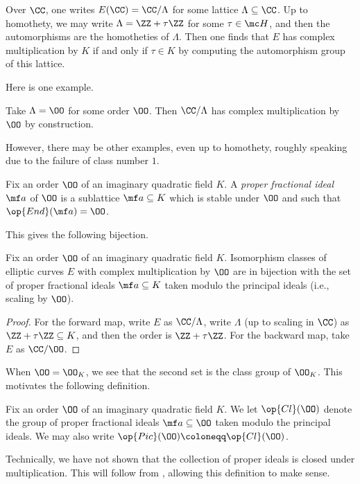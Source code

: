 \documentclass[../notes.tex]{subfiles}
\begin{document}
\begin{remark}
	Over $\CC$, one writes $E(\CC)=\CC/\Lambda$ for some lattice $\Lambda\subseteq\CC$. Up to homothety, we may write $\Lambda=\ZZ+\tau\ZZ$ for some $\tau\in\mc H$, and then the automorphisms are the homotheties of $\Lambda$. Then one finds that $E$ has complex multiplication by $K$ if and only if $\tau\in K$ by computing the automorphism group of this lattice.
\end{remark}
Here is one example.
\begin{example}
	Take $\Lambda=\OO$ for some order $\OO$. Then $\CC/\Lambda$ has complex multiplication by $\OO$ by construction.
\end{example}
However, there may be other examples, even up to homothety, roughly speaking due to the failure of class number $1$.
\begin{definition}[proper]
	Fix an order $\OO$ of an imaginary quadratic field $K$. A \textit{proper fractional ideal} $\mf a$ of $\OO$ is a sublattice $\mf a\subseteq K$ which is stable under $\OO$ and such that $\op{End}(\mf a)=\OO$.
\end{definition}
This gives the following bijection.
\begin{proposition}
	Fix an order $\OO$ of an imaginary quadratic field $K$. Isomorphism classes of elliptic curves $E$ with complex multiplication by $\OO$ are in bijection with the set of proper fractional ideals $\mf a\subseteq K$ taken modulo the principal ideals (i.e., scaling by $\OO$).
\end{proposition}
\begin{proof}
	For the forward map, write $E$ as $\CC/\Lambda$, write $\Lambda$ (up to scaling in $\CC$) as $\ZZ+\tau\ZZ\subseteq K$, and then the order is $\ZZ+\tau\ZZ$. For the backward map, take $E$ as $\CC/\OO$.
\end{proof}
When $\OO=\OO_K$, we see that the second set is the class group of $\OO_K$. This motivates the following definition.
\begin{definition}
	Fix an order $\OO$ of an imaginary quadratic field $K$. We let $\op{Cl}(\OO)$ denote the group of proper fractional ideals $\mf a\subseteq\OO$ taken modulo the principal ideals. We may also write $\op{Pic}(\OO)\coloneqq\op{Cl}(\OO)$.
\end{definition}
\begin{remark}
	Technically, we have not shown that the collection of proper ideals is closed under multiplication. This will follow from , allowing this definition to make sense.
\end{remark}
\end{document}

